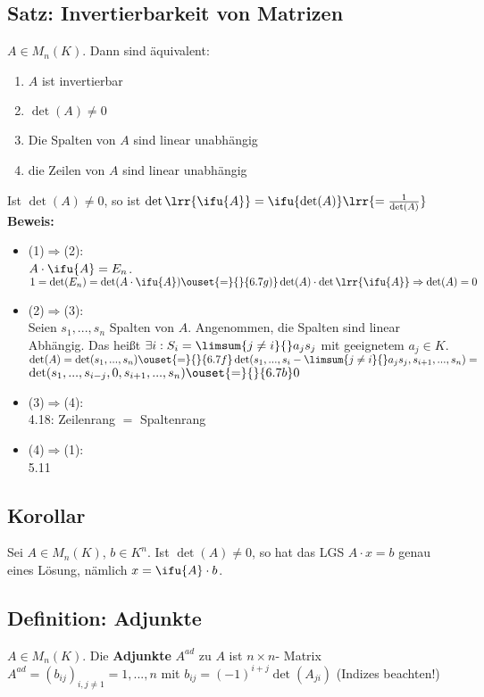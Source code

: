 \subsection{Satz: Invertierbarkeit von Matrizen}
  $A\in M_n(K)$. Dann sind äquivalent:
  \begin{enumerate}[(1)]
    \item $A$ ist invertierbar
    \item $\det(A)\neq 0$
    \item Die Spalten von $A$ sind linear unabhängig
    \item die Zeilen von $A$ sind linear unabhängig
  \end{enumerate}
  Ist $\det(A)\neq 0$, so ist $\det\lrr{\ifu{A}}=\ifu{\det(A)}\lrr{=\frac{1}{\det(A)}}$\\
  \textbf{Beweis:}
  \begin{itemize}
    \item (1)$\Rightarrow$(2):\\
      $A\cdot \ifu{A}=E_n$. $1=\det(E_n)=\det(A\cdot\ifu{A})\ouset{=}{}{6.7g)}\det(A)\cdot\det\lrr{\ifu{A}}\\
      \Rightarrow\det(A)=0$
    \item (2)$\Rightarrow$(3):\\
      Seien $s_1,...,s_n$ Spalten von $A$. Angenommen, die Spalten sind linear
      Abhängig. Das heißt $\exists i: S_i=\limsum{j\neq i}{}a_js_j$ mit
      geeignetem $a_j\in K$.\\
      $\det(A)=\det(s_1,...,s_n)\ouset{=}{}{6.7f}\det(s_1,...,s_i-\limsum{j\neq
      i}{}a_js_j,s_{i+1},...,s_n)=$\\
      $\det(s_1,...,s_{i-j},0,s_{i+1},...,s_n)\ouset{=}{}{6.7b}0$\lightning
    \item (3)$\Rightarrow$(4):\\
      4.18: Zeilenrang $=$ Spaltenrang
    \item (4)$\Rightarrow$(1):\\
      5.11
  \end{itemize}

\subsection{Korollar}
Sei $A\in M_n(K)$, $b\in K^n$. Ist $\det(A)\neq 0$, so hat das LGS $A\cdot x=b$
genau eines Lösung, nämlich $x=\ifu{A}\cdot b$.

\subsection{Definition: Adjunkte}
$A\in M_n(K)$. Die \textbf{Adjunkte} $A^{ad}$ zu $A$ ist $n\times n$- Matrix
$A^{ad}=(b_{ij})_{i,j\neq 1}=1,...,n$ mit $b_{ij}=(-1)^{i+j}\det(A_{ji})$
(Indizes beachten!)

